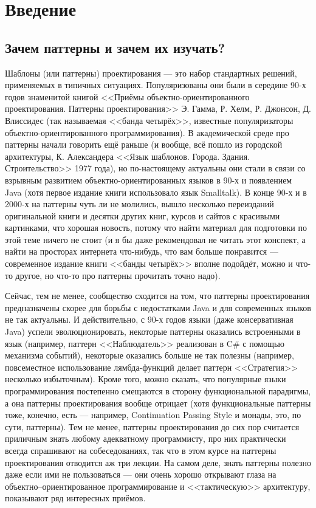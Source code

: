 \documentclass{../mcstext}
\begin{document}
\maketitle
\thispagestyle{empty}

\section{Введение}

\subsection{Зачем паттерны и зачем их изучать?}

Шаблоны (или паттерны) проектирования --- это набор стандартных решений, применяемых в типичных ситуациях. Популяризованы они были в середине 90-х годов знаменитой книгой <<Приёмы объектно-ориентированного проектирования. Паттерны проектирования>> Э. Гамма, Р. Хелм, Р. Джонсон, Д. Влиссидес (так называемая <<банда четырёх>>, известные популяризаторы объектно-ориентированного программирования). В академической среде про паттерны начали говорить ещё раньше (и вообще, всё пошло из городской архитектуры, К. Александера <<Язык шаблонов. Города. Здания. Строительство>> 1977 года), но по-настоящему актуальны они стали в связи со взрывным развитием объектно-ориентированных языков в 90-х и появлением Java (хотя первое издание книги использовало язык Smalltalk). В конце 90-х и в 2000-х на паттерны чуть ли не молились, вышло несколько переизданий оригинальной книги и десятки других книг, курсов и сайтов с красивыми картинками, что хорошая новость, потому что найти материал для подготовки по этой теме ничего не стоит (и я бы даже рекомендовал не читать этот конспект, а найти на просторах интернета что-нибудь, что вам больше понравится --- современное издание книги <<банды четырёх>> вполне подойдёт, можно и что-то другое, но что-то про паттерны прочитать точно надо). 

Сейчас, тем не менее, сообщество сходится на том, что паттерны проектирования предназначены скорее для борьбы с недостатками Java и для современных языков не так актуальны. И действительно, с 90-х годов языки (даже консервативная Java) успели эволюционировать, некоторые паттерны оказались встроенными в язык (например, паттерн <<Наблюдатель>> реализован в C\# с помощью механизма событий), некоторые оказались больше не так полезны (например, повсеместное использование лямбда-функций делает паттерн <<Стратегия>> несколько избыточным). Кроме того, можно сказать, что популярные языки программирования постепенно смещаются в сторону функциональной парадигмы, а она паттерны проектирования вообще отрицает (хотя функциональные паттерны тоже, конечно, есть --- например, Continuation Passing Style и монады, это, по сути, паттерны). Тем не менее, паттерны проектирования до сих пор считается приличным знать любому адекватному программисту, про них практически всегда спрашивают на собеседованиях, так что в этом курсе на паттерны проектирования отводится аж три лекции. На самом деле, знать паттерны полезно даже если ими не пользоваться --- они очень хорошо открывают глаза на объектно--ориентированное программирование и <<тактическую>> архитектуру, показывают ряд интересных приёмов.
\end{document}
